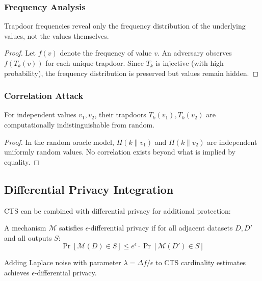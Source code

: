 \documentclass[../main_comprehensive.tex]{subfiles}
\begin{document}
\subsubsection{Frequency Analysis}

\begin{theorem}
Trapdoor frequencies reveal only the frequency distribution of the underlying values, not the values themselves.
\end{theorem}

\begin{proof}
Let $f(v)$ denote the frequency of value $v$. An adversary observes $f(T_k(v))$ for each unique trapdoor. Since $T_k$ is injective (with high probability), the frequency distribution is preserved but values remain hidden.
\end{proof}

\subsubsection{Correlation Attack}

\begin{theorem}
For independent values $v_1, v_2$, their trapdoors $T_k(v_1), T_k(v_2)$ are computationally indistinguishable from random.
\end{theorem}

\begin{proof}
In the random oracle model, $H(k \| v_1)$ and $H(k \| v_2)$ are independent uniformly random values. No correlation exists beyond what is implied by equality.
\end{proof}

\subsection{Differential Privacy Integration}

CTS can be combined with differential privacy for additional protection:

\begin{definition}
A mechanism $\mathcal{M}$ satisfies $\epsilon$-differential privacy if for all adjacent datasets $D, D'$ and all outputs $S$:
$$\Pr[\mathcal{M}(D) \in S] \leq e^\epsilon \cdot \Pr[\mathcal{M}(D') \in S]$$
\end{definition}

\begin{theorem}
Adding Laplace noise with parameter $\lambda = \Delta f/\epsilon$ to CTS cardinality estimates achieves $\epsilon$-differential privacy.
\end{theorem}
\end{document}
